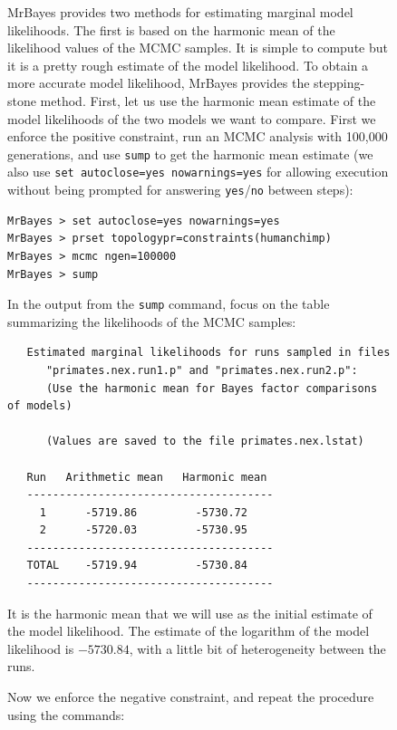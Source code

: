 \documentclass[12pt]{book}
\newcommand{\ttt}[1]{\texttt{#1}}
\begin{document}
\begin{figure}[h]
MrBayes provides two methods for estimating marginal model likelihoods. The first is based on the
harmonic mean of the likelihood values of the MCMC samples. It is simple to compute but it is a
pretty rough estimate of the model likelihood. To obtain a more accurate model likelihood, MrBayes
provides the stepping-stone method. First, let us use the harmonic mean estimate of the model
likelihoods of the two models we want to compare. First we enforce the positive constraint, run an
MCMC analysis with 100,000 generations, and use \ttt{sump} to get the harmonic mean estimate (we
also use \ttt{set autoclose=yes nowarnings=yes} for allowing execution without being prompted for
answering \ttt{yes}/\ttt{no} between steps):

\begin{singlespacing}
\small
\begin{verbatim}
MrBayes > set autoclose=yes nowarnings=yes
MrBayes > prset topologypr=constraints(humanchimp)
MrBayes > mcmc ngen=100000
MrBayes > sump
\end{verbatim}
\end{singlespacing}
\normalsize

In the output from the \ttt{sump} command, focus on the table summarizing the likelihoods of the
MCMC samples:

\begin{singlespacing}
\footnotesize
\begin{verbatim}
   Estimated marginal likelihoods for runs sampled in files
      "primates.nex.run1.p" and "primates.nex.run2.p":
      (Use the harmonic mean for Bayes factor comparisons of models)

      (Values are saved to the file primates.nex.lstat)

   Run   Arithmetic mean   Harmonic mean
   --------------------------------------
     1      -5719.86         -5730.72
     2      -5720.03         -5730.95
   --------------------------------------
   TOTAL    -5719.94         -5730.84
   --------------------------------------

\end{verbatim}
\end{singlespacing}
\normalsize

It is the harmonic mean that we will use as the initial estimate of the model likelihood. The
estimate of the logarithm of the model likelihood is $-5730.84$, with a little bit of heterogeneity
between the runs.

Now we enforce the negative constraint, and repeat the procedure using the commands:


\end{figure}
\end{document}
